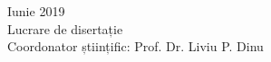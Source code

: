 \documentclass[12pt]{report}
\begin{document}
\begin{titlepage}
	\vfill %
	{Iunie 2019 \\ Lucrare de disertație \\ Coordonator științific: Prof. Dr. Liviu P. Dinu}\\[1cm] %
	
	
	
\end{titlepage}
\end{document}
